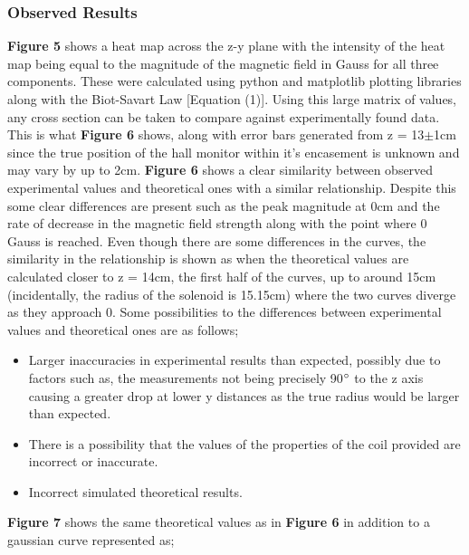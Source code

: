\documentclass{article}
\begin{document}
   \subsubsection{Observed Results}
   \textbf{Figure 5} shows a heat map across the z-y plane with the intensity of the heat map being equal to the magnitude of the magnetic field in Gauss for all three components. These were calculated 
   using python and matplotlib plotting libraries along with the Biot-Savart Law [Equation (1)].
   \newline Using this large matrix of values, any cross section can be taken to compare against experimentally found data.
   \newline This is what \textbf{Figure 6} shows, along with error bars generated from z = 13\(\pm\)1cm since the true position of the hall monitor within 
   it's encasement is unknown and may vary by up to 2cm.
   \newline
   \newline
   \textbf{Figure 6} shows a clear similarity between observed experimental values and theoretical ones with a similar relationship. Despite this some clear differences are present
   such as the peak magnitude at 0cm and the rate of decrease in the magnetic field strength along with the point where 0 Gauss is reached. Even though there are some differences in the curves, 
   the similarity in the relationship is shown as when the theoretical values are calculated closer to z = 14cm, the first half of the curves, up to around 15cm (incidentally, the radius of the solenoid is 15.15cm)
   where the two curves diverge as they approach 0.
   \newline Some possibilities to the differences between experimental values and theoretical ones are as follows;
   \begin{itemize}
       \item Larger inaccuracies in experimental results than expected, possibly due to factors such as, the measurements not being precisely 90\(\degree\) to the z axis causing a greater drop at lower y distances as the true radius would be larger than expected.
       \item There is a possibility that the values of the properties of the coil provided are incorrect or inaccurate.
       \item Incorrect simulated theoretical results.
   \end{itemize}
   \textbf{Figure 7} shows the same theoretical values as in \textbf{Figure 6} in addition to a gaussian curve represented as;
\end{document}
